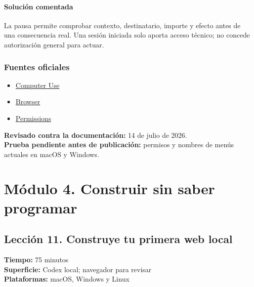 \documentclass[10pt,a4paper,openany]{book}
\providecommand{\tightlist}{\setlength{\itemsep}{0.18em}\setlength{\parskip}{0pt}}
\begin{document}
\subsubsection{Solución comentada}\label{soluciuxf3n-comentada-10}

La pausa permite comprobar contexto, destinatario, importe y efecto
antes de una consecuencia real. Una sesión iniciada solo aporta acceso
técnico; no concede autorización general para actuar.

\subsection{Fuentes oficiales}\label{fuentes-oficiales-9}

\begin{itemize}
\tightlist
\item
  \href{https://learn.chatgpt.com/docs/computer-use}{Computer Use}
\item
  \href{https://learn.chatgpt.com/docs/browser}{Browser}
\item
  \href{https://learn.chatgpt.com/docs/permissions}{Permissions}
\end{itemize}

\textbf{Revisado contra la documentación:} 14 de julio de 2026.\\
\textbf{Prueba pendiente antes de publicación:} permisos y nombres de
menús actuales en macOS y Windows.

\chapter{Módulo 4. Construir sin saber
programar}\label{muxf3dulo-4.-construir-sin-saber-programar}

\clearpage

\section{Lección 11. Construye tu primera web
local}\label{lecciuxf3n-11.-construye-tu-primera-web-local}

\begin{metabox}

\textbf{Tiempo:} 75 minutos\\
\textbf{Superficie:} Codex local; navegador para revisar\\
\textbf{Plataformas:} macOS, Windows y Linux

\end{metabox}
\end{document}
